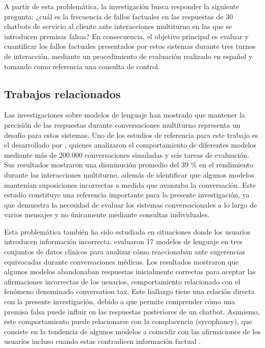 \documentclass[manuscrito,spanish]{rcc}
\begin{document}
A partir de esta problemática, la investigación busca responder la siguiente pregunta: ¿cuál es la frecuencia de fallos factuales en las respuestas de 30 chatbots de servicio al cliente ante interacciones multiturno en las que se introducen premisas falsas? En consecuencia, el objetivo principal es evaluar y cuantificar los fallos factuales presentados por estos sistemas durante tres turnos de interacción, mediante un procedimiento de evaluación realizado en español y tomando como referencia una consulta de control.

\subsection{Trabajos relacionados}
Las investigaciones sobre modelos de lenguaje han mostrado que mantener la precisión de las respuestas durante conversaciones multiturno representa un desafío para estos sistemas. Uno de los estudios de referencia para este trabajo es el desarrollado por \citet{laban2025}, quienes analizaron el comportamiento de diferentes modelos mediante más de 200.000 conversaciones simuladas y seis tareas de evaluación. Sus resultados mostraron una disminución promedio del 39 \% en el rendimiento durante las interacciones multiturno, además de identificar que algunos modelos mantenían suposiciones incorrectas a medida que avanzaba la conversación. Este estudio constituye una referencia importante para la presente investigación, ya que demuestra la necesidad de evaluar los sistemas conversacionales a lo largo de varios mensajes y no únicamente mediante consultas individuales.

Esta problemática también ha sido estudiada en situaciones donde los usuarios introducen información incorrecta. \citet{guo2026} evaluaron 17 modelos de lenguaje en tres conjuntos de datos clínicos para analizar cómo reaccionaban ante sugerencias equivocadas durante conversaciones médicas. Los resultados mostraron que algunos modelos abandonaban respuestas inicialmente correctas para aceptar las afirmaciones incorrectas de los usuarios, comportamiento relacionado con el fenómeno denominado conversation tax. Este hallazgo tiene una relación directa con la presente investigación, debido a que permite comprender cómo una premisa falsa puede influir en las respuestas posteriores de un chatbot. Asimismo, este comportamiento puede relacionarse con la complacencia (sycophancy), que consiste en la tendencia de algunos modelos a coincidir con las afirmaciones de los usuarios incluso cuando estas contradicen información factual \citep{sharma2024}.
\end{document}
